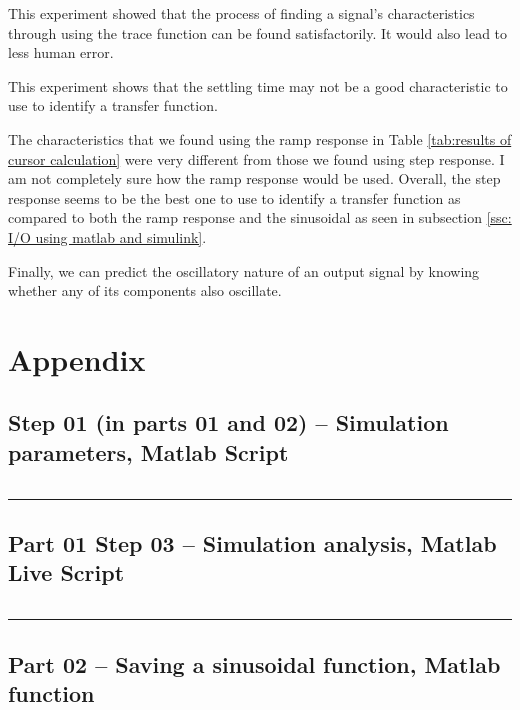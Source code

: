 \documentclass[12pt]{article}
\def\hr{{\par\noindent\rule{\textwidth}{0.4pt}}}
\begin{document}
This experiment showed that the process of finding a signal's characteristics through using the trace function can be found satisfactorily. It would also lead to less human error.

This experiment shows that the settling time may not be a good characteristic to use to identify a transfer function.

The characteristics that we found using the ramp response in Table \ref{tab:results of cursor calculation} were very different from those we found using step response. I am not completely sure how the ramp response would be used. Overall, the step response seems to be the best one to use to identify a transfer function as compared to both the ramp response and the sinusoidal as seen in subsection \ref{ssc: I/O using matlab and simulink}.

Finally, we can predict the oscillatory nature of an output signal by knowing whether any of its components also oscillate.

\newpage
\appendix
\section{Appendix}

\subsection{Step 01 (in parts 01 and 02) -- Simulation parameters, Matlab Script}\label{sap:simulation params}
\inputminted{matlab}{step01_simulation_params.m}

\hr

\subsection{Part 01 Step 03 -- Simulation analysis, Matlab Live Script}\label{sap:simulation analysis mlx}
\inputminted{matlab}{step03_simulation_analysis_mlx.m}

\hr

\subsection{Part 02 -- Saving a sinusoidal function, Matlab function}\label{sap:save sinusoid}
\inputminted{matlab}{part02_save_sinusoid.m}
\end{document}
